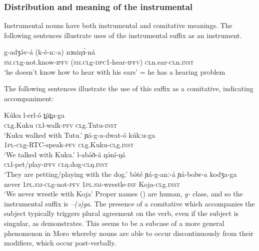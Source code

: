 \subsubsection{Distribution and meaning of the instrumental}

Instrumental nouns have both instrumental and comitative meanings. The following sentences illustrate uses of the instrumental suffix as an instrument. 

\ea \gll	g-adʒə́v-á 	(k-é-nː-a) 	nɜniŋɜ́-ná	\\
\textsc{sm.cl}g-not.know-\textsc{ipfv} 	(\textsc{sm.cl}g-\textsc{dpc}1-hear-\textsc{ipfv})	\textsc{cl}n.ear-\textsc{cl}n.\textsc{inst}\\
\glt ‘he doesn’t know how to hear with his ears’ = he has a hearing problem
\z 

The following sentences illustrate the use of this suffix as a comitative, indicating accompaniment:

\ea
	\ea	\gll Kúku        l-erl-ó             t̪út̪u-ga	\\
\textsc{cl}g.Kuku \textsc{cl}l-walk-\textsc{pfv} \textsc{cl}g.Tutu-\textsc{inst}		\\
		\glt `Kuku walked with Tutu.'\label{ex:ch6:plcomit}
	\ex \gll	ɲá-g-a-dwat-ó kúkːu-ga	\\
1\textsc{pl-}\textsc{cl}g-RTC-speak-\textsc{pfv} \textsc{cl}g.Kuku-\textsc{cl}g.\textsc{inst}			\\
		\glt ‘We talked with Kuku.’
	\ex \gll 	l-abə́ð-á ŋə́ní-ŋá \\
	\textsc{cl}l-pet/play-\textsc{ipfv} \textsc{cl}ŋ.dog-\textsc{cl}ŋ.\textsc{inst} \\
		\glt `They are petting/playing with the dog.’
	\ex	\gll	bə́té	ɲá-g-anː-á 	ɲá-bolw-a 		kodʒa-ga \\
never	1\textsc{pl}.\textsc{sm-}\textsc{cl}g-not-\textsc{pfv}	1\textsc{pl}.\textsc{sm-}wrestle-\textsc{inf}	Koja-\textsc{cl}g.\textsc{inst}\\
		\glt 	‘We never wrestle with Koja’ 
\z \z 
Proper names () are human, \textit{g-} class, and so the instrumental suffix is \textit{–(ə)ga}. The presence of a comitative which accompanies the subject typically triggers plural agreement on the verb, even if the subject is singular, as  demonstrates. This seems to be a subcase of a more general phenomenon in Moro whereby nouns are able to occur discontinuously from their modifiers, which occur post-verbally. 


